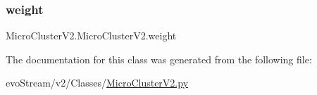 \mbox{\label{classMicroClusterV2_1_1MicroClusterV2_a5373137259c548f4eb8b8ce8d7356a1a}} 
\subsubsection{\texorpdfstring{weight}{weight}}
{\footnotesize\ttfamily Micro\+Cluster\+V2.\+Micro\+Cluster\+V2.\+weight}



The documentation for this class was generated from the following file\+:\begin{DoxyCompactItemize}
\item 
evo\+Stream/v2/\+Classes/\hyperlink{MicroClusterV2_8py}{Micro\+Cluster\+V2.\+py}\end{DoxyCompactItemize}
